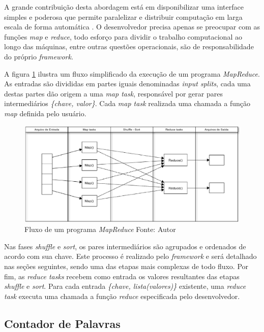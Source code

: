 A grande contribuição desta abordagem está em disponibilizar uma interface simples e poderosa que permite paralelizar e distribuir computação em larga escala de forma automática \cite{ghemawatMapreduce2008}. O desenvolvedor precisa apenas se preocupar com as funções \textit{map} e \textit{reduce}, todo esforço para dividir o trabalho computacional ao longo das máquinas, entre outras questões operacionais, são de responsabilidade do próprio \textit{framework}.

A figura \ref{fig-mapreduce} ilustra um fluxo simplificado da execução de um programa \textit{MapReduce}. As entradas são divididas em partes iguais denominadas \textit{input splits}, cada uma destas partes dão origem a uma \textit{map task}, responsável por gerar pares intermediários \textit{\{chave, valor\}}. Cada \textit{map task} realizada uma chamada a função \textit{map} definida pelo usuário.

\begin{figure}[ht!]
	\centering
	\includegraphics[keepaspectratio=true,scale=0.5]
	  {figuras/mapreduce.eps}
	\caption[Fluxo de um programa \textit{MapReduce}]{Fluxo de um programa \textit{MapReduce}
	\protect\linebreak Fonte: Autor}
	\label{fig-mapreduce}
\end{figure}
\FloatBarrier

Nas fases \textit{shuffle} e \textit{sort}, os pares intermediários são agrupados e ordenados de acordo com sua chave. Este processo é realizado pelo \textit{framework} e será detalhado nas seções seguintes, sendo uma das etapas mais complexas de todo fluxo. Por fim, as \textit{reduce tasks} recebem como entrada os valores resultantes das etapas \textit{shuffle} e \textit{sort}. Para cada entrada \textit{\{chave, lista(valores)\}} existente, uma \textit{reduce task} executa uma chamada a função \textit{reduce} especificada pelo desenvolvedor.

\subsection{Contador de Palavras}
\label{sec-wc}

